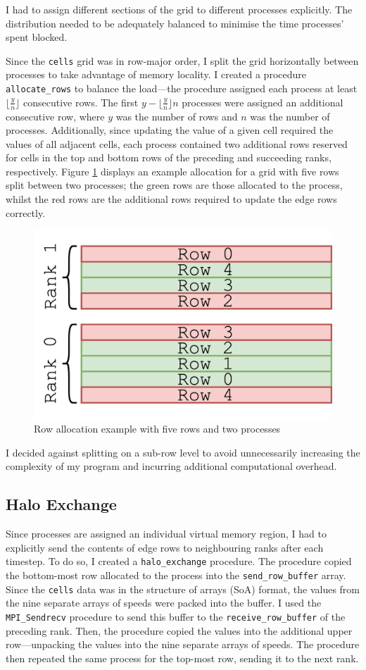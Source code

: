 \documentclass[twocolumn, a4paper]{article}
\begin{document}
I had to assign different sections of the grid to different processes explicitly.
The distribution needed to be adequately balanced to minimise the time processes' spent blocked.

Since the \texttt{cells} grid was in row-major order, I split the grid horizontally between processes to take advantage of memory locality.
I created a procedure \texttt{allocate\_rows} to balance the load---the procedure assigned each process at least $\lfloor\frac{y}{n}\rfloor$ consecutive rows.
The first $y - \lfloor\frac{y}{n}\rfloor n$ processes were assigned an additional consecutive row, where $y$ was the number of rows and $n$ was the number of processes.
Additionally, since updating the value of a given cell required the values of all adjacent cells, each process contained two additional rows reserved for cells in the top and bottom rows of the preceding and succeeding ranks, respectively.
Figure \ref{fig:rows} displays an example allocation for a grid with five rows split between two processes; the green rows are those allocated to the process, whilst the red rows are the additional rows required to update the edge rows correctly.

\begin{figure}[htbp]
  \centering
  \includegraphics[width=.6\linewidth]{rows.png}
  \caption{Row allocation example with five rows and two processes}\label{fig:rows}
\end{figure}

I decided against splitting on a sub-row level to avoid unnecessarily increasing the complexity of my program and incurring additional computational overhead.

\subsection{Halo Exchange}

Since processes are assigned an individual virtual memory region, I had to explicitly send the contents of edge rows to neighbouring ranks after each timestep.
To do so, I created a \texttt{halo\_exchange} procedure.
The procedure copied the bottom-most row allocated to the process into the \texttt{send\_row\_buffer} array.
Since the \texttt{cells} data was in the structure of arrays (SoA) format, the values from the nine separate arrays of speeds were packed into the buffer.
I used the \texttt{MPI\_Sendrecv} procedure to send this buffer to the \texttt{receive\_row\_buffer} of the preceding rank.
Then, the procedure copied the values into the additional upper row---unpacking the values into the nine separate arrays of speeds.
The procedure then repeated the same process for the top-most row, sending it to the next rank.
\end{document}
